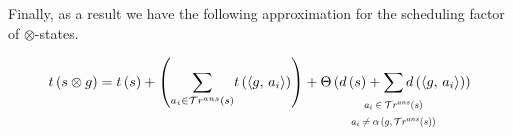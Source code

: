 Finally, as a result we have the following approximation for the scheduling factor of $\otimes$-states.

\begin{corollary}
\[
 t\,(s \otimes g)  =  t\,(s) + \left({\sum\limits_{a_i \in \tra{s}}} t\,(\taskst{g}{a_i})\right) +
 \Theta\,(d\,(s) + \smashoperator[lr]{\sum\limits_{\begin{array}{c}
                                                                                   \scalebox{0.7}{$a_i \in \tra{s}$} \\
                                                                                   \scalebox{0.7}{$a_i \ne \alpha\,(g, \tra{s}) $} \\
                                                                              \end{array}}} d\,(\taskst{g}{a_i}))	
\]
\end{corollary}










